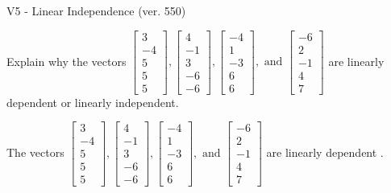 \begin{exercise}
  \begin{exerciseTitle}V5 - Linear Independence (ver. 550)\end{exerciseTitle}
  \begin{exerciseStatement}
    Explain why the vectors \(\left[\begin{array}{r}
3 \\
-4 \\
5 \\
5 \\
5
\end{array}\right] , \left[\begin{array}{r}
4 \\
-1 \\
3 \\
-6 \\
-6
\end{array}\right] , \left[\begin{array}{r}
-4 \\
1 \\
-3 \\
6 \\
6
\end{array}\right] , \text{ and } \left[\begin{array}{r}
-6 \\
2 \\
-1 \\
4 \\
7
\end{array}\right]\) are linearly dependent or linearly independent.	


  \end{exerciseStatement}
  \begin{exerciseAnswer}
   The vectors \(\left[\begin{array}{r}
3 \\
-4 \\
5 \\
5 \\
5
\end{array}\right] , \left[\begin{array}{r}
4 \\
-1 \\
3 \\
-6 \\
-6
\end{array}\right] , \left[\begin{array}{r}
-4 \\
1 \\
-3 \\
6 \\
6
\end{array}\right] , \text{ and } \left[\begin{array}{r}
-6 \\
2 \\
-1 \\
4 \\
7
\end{array}\right]\) are 
  	 linearly dependent  .
  


  \end{exerciseAnswer}
\end{exercise}